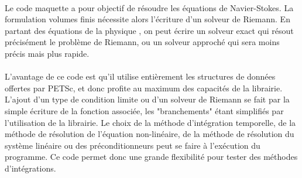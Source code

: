     \paragraph{}
    Le code maquette a pour objectif de résoudre les équations de Navier-Stokes.
    La formulation volumes finis nécessite alors l'écriture d'un solveur de Riemann.
    En partant des équations de la physique \cite{Masatsuka2013}, on peut écrire un solveur exact \cite{GottliebGroth1988} qui résout précisément le problème de Riemann, ou un solveur approché \cite{Roe1981} qui sera moins précis mais plus rapide.

    \paragraph{}
    L'avantage de ce code est qu'il utilise entièrement les structures de données offertes par PETSc, et donc profite au maximum des capacités de la librairie.
    L'ajout d'un type de condition limite ou d'un solveur de Riemann se fait par la simple écriture de la fonction associée, les "branchements" étant simplifiés par l'utilisation de la librairie.
    Le choix de la méthode d'intégration temporelle, de la méthode de résolution de l'équation non-linéaire, de la méthode de résolution du système linéaire ou des préconditionneurs peut se faire à l'exécution du programme.
    Ce code permet donc une grande flexibilité pour tester des méthodes d’intégrations.
